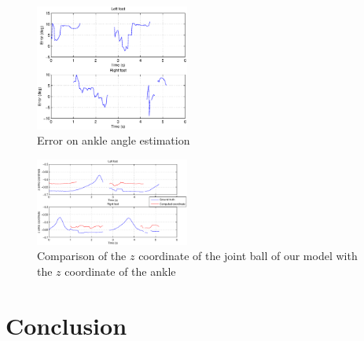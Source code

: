 \documentclass[letterpaper, 10 pt, conference]{ieeeconf}
\begin{document}
\begin{figure}
	\centering
	\includegraphics[width=0.45\textwidth]{images/errorAnkle}
	\caption{Error on ankle angle estimation}
	\label{fig:errorAnkle}
\end{figure}

\begin{figure}
	\centering
	\includegraphics[width=0.45\textwidth]{images/zAnkle}
	\caption{Comparison of the $z$ coordinate of the joint ball of our model with the $z$ coordinate of the ankle}
	\label{fig:zAnkle}
\end{figure}


\section{Conclusion}


 


\end{document}
